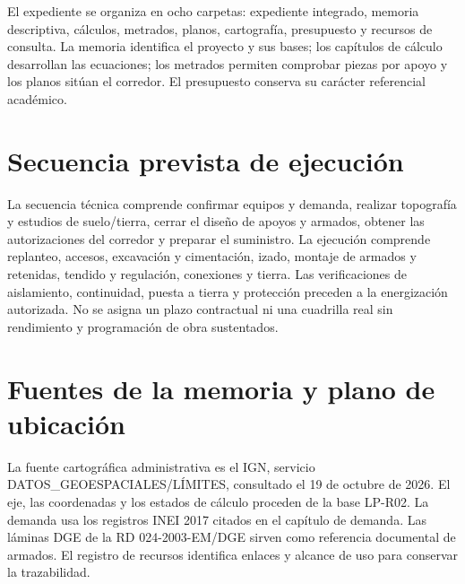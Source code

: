 El expediente se organiza en ocho carpetas: expediente integrado, memoria
descriptiva, cálculos, metrados, planos, cartografía, presupuesto y recursos de
consulta. La memoria identifica el proyecto y sus bases; los capítulos de cálculo
desarrollan las ecuaciones; los metrados permiten comprobar piezas por apoyo y los
planos sitúan el corredor. El presupuesto conserva su carácter referencial académico.

\section{Secuencia prevista de ejecución}
La secuencia técnica comprende confirmar equipos y demanda, realizar topografía
y estudios de suelo/tierra, cerrar el diseño de apoyos y armados, obtener las
autorizaciones del corredor y preparar el suministro. La ejecución comprende
replanteo, accesos, excavación y cimentación, izado, montaje de armados y retenidas,
tendido y regulación, conexiones y tierra. Las verificaciones de aislamiento,
continuidad, puesta a tierra y protección preceden a la energización autorizada.
No se asigna un plazo contractual ni una cuadrilla real sin rendimiento y
programación de obra sustentados.

\section{Fuentes de la memoria y plano de ubicación}
La fuente cartográfica administrativa es el IGN, servicio
DATOS\_GEOESPACIALES/LÍMITES, consultado el 19 de octubre de 2026. El eje, las
coordenadas y los estados de cálculo proceden de la base LP-R02. La demanda usa
los registros INEI 2017 citados en el capítulo de demanda. Las láminas DGE de la
RD 024-2003-EM/DGE sirven como referencia documental de armados. El registro de
recursos identifica enlaces y alcance de uso para conservar la trazabilidad.
